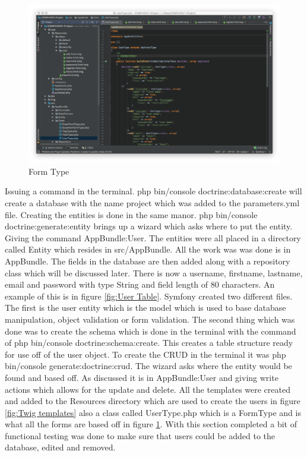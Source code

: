 \begin{figure}[htbp]
   \centering
   \includegraphics[width=400pt]{figures/form_type.png} %
   \caption{Form Type}
   \label{fig:Form Type}
\end{figure}

Issuing a command in the terminal. php bin/console doctrine:database:create will create a database with the name project which was added to the parameters.yml file. Creating the entities is done in the same manor. php bin/console doctrine:generate:entity brings up a wizard which asks where to put the entity. Giving the command AppBundle:User. The entities were all placed in a directory called Entity which resides in src/AppBundle. All the work was was done is in AppBundle. The fields in the database are then added along with a repository class which will be discussed later. There is now a username, firstname, lastname, email and password with type String and field length of 80 characters. An example of this is in figure \ref{fig:User Table}. Symfony created two different files. The first is the user entity which is the model which is used to base database manipulation, object validation or form validation. The second thing which was done was to create the schema which is done in the terminal with the command of php bin/console doctrine:schema:create. This creates a table structure ready for use off of the user object. To create the CRUD in the terminal it was php bin/console generate:doctrine:crud. The wizard asks where the entity would be found and based off. As discussed it is in AppBundle:User and giving write actions which allows for the update and delete. All the templates were created and added to the Resources directory which are used to create the users in figure \ref{fig:Twig templates} also a class called UserType.php which is a FormType and is what all the forms are based off in figure \ref{fig:Form Type}. With this section completed a bit of functional testing was done to make sure that users could be added to the database, edited and removed.

